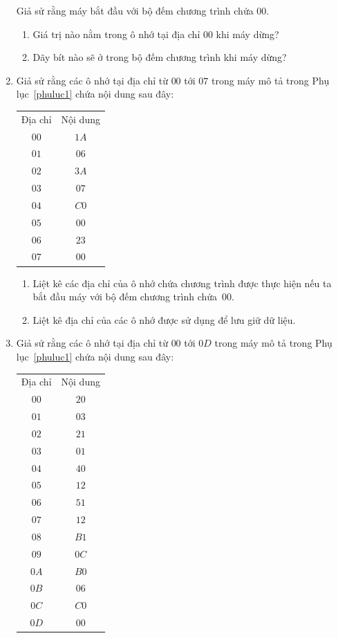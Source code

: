 \begin{multicols}{2}
\begin{enumerate}
    Giả sử rằng máy bắt đầu với bộ đếm chương trình chứa $00$.

    \begin{enumerate}
    \item Giá trị nào nằm trong ô nhớ tại địa chỉ $00$ khi máy dừng?

    \item Dãy bít nào sẽ ở trong bộ đếm chương trình khi máy dừng?
    \end{enumerate}

  \item Giả sử rằng các ô nhớ tại địa chỉ từ $00$ tới $07$ trong máy mô tả trong Phụ
    lục~\ref{phuluc1} chứa nội dung sau đây:

    \begin{tabular}{cc}
      Địa chỉ & Nội dung \\
      $00$    & $1A$     \\
      $01$    & $06$     \\
      $02$    & $3A$     \\
      $03$    & $07$     \\
      $04$    & $C0$     \\
      $05$    & $00$     \\
      $06$    & $23$     \\
      $07$    & $00$
    \end{tabular}

    \begin{enumerate}
    \item Liệt kê các địa chỉ của ô nhớ chứa chương trình được thực hiện nếu ta bắt đầu
      máy với bộ đếm chương trình chứa~$00$.

    \item Liệt kê địa chỉ của các ô nhớ được sử dụng để lưu giữ dữ liệu.
    \end{enumerate}


  \item Giả sử rằng các ô nhớ tại địa chỉ từ $00$ tới $0D$ trong máy mô tả trong Phụ
    lục~\ref{phuluc1} chứa nội dung sau đây:

    \begin{tabular}{cc}
      Địa chỉ & Nội dung \\
      $00$    & $20$     \\
      $01$    & $03$     \\
      $02$    & $21$     \\
      $03$    & $01$     \\
      $04$    & $40$     \\
      $05$    & $12$     \\
      $06$    & $51$     \\
      $07$    & $12$     \\
      $08$    & $B1$     \\
      $09$    & $0C$     \\
      $0A$    & $B0$     \\
      $0B$    & $06$     \\
      $0C$    & $C0$     \\
      $0D$    & $00$    


\end{tabular}
\end{enumerate}
\end{multicols}
